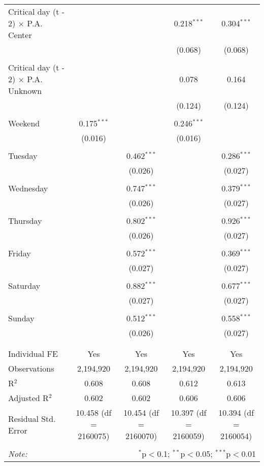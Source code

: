 \documentclass[
]{article}
\begin{document}
\begin{table}[!htbp]
{\begin{tabular}{@{\extracolsep{5pt}}lcccc}
 Critical day (t - 2) $\times$ P.A. Center &  &  & 0.218$^{***}$ & 0.304$^{***}$ \\ 
  &  &  & (0.068) & (0.068) \\ 
  & & & & \\ 
 Critical day (t - 2) $\times$ P.A. Unknown &  &  & 0.078 & 0.164 \\ 
  &  &  & (0.124) & (0.124) \\ 
  & & & & \\ 
 Weekend & 0.175$^{***}$ &  & 0.246$^{***}$ &  \\ 
  & (0.016) &  & (0.016) &  \\ 
  & & & & \\ 
 Tuesday &  & 0.462$^{***}$ &  & 0.286$^{***}$ \\ 
  &  & (0.026) &  & (0.027) \\ 
  & & & & \\ 
 Wednesday &  & 0.747$^{***}$ &  & 0.379$^{***}$ \\ 
  &  & (0.026) &  & (0.027) \\ 
  & & & & \\ 
 Thursday &  & 0.802$^{***}$ &  & 0.926$^{***}$ \\ 
  &  & (0.026) &  & (0.027) \\ 
  & & & & \\ 
 Friday &  & 0.572$^{***}$ &  & 0.369$^{***}$ \\ 
  &  & (0.027) &  & (0.027) \\ 
  & & & & \\ 
 Saturday &  & 0.882$^{***}$ &  & 0.677$^{***}$ \\ 
  &  & (0.027) &  & (0.027) \\ 
  & & & & \\ 
 Sunday &  & 0.512$^{***}$ &  & 0.558$^{***}$ \\ 
  &  & (0.026) &  & (0.027) \\ 
  & & & & \\ 
\hline \\[-1.8ex] 
Individual FE & Yes & Yes & Yes & Yes \\ 
Observations & 2,194,920 & 2,194,920 & 2,194,920 & 2,194,920 \\ 
R$^{2}$ & 0.608 & 0.608 & 0.612 & 0.613 \\ 
Adjusted R$^{2}$ & 0.602 & 0.602 & 0.606 & 0.606 \\ 
Residual Std. Error & 10.458 (df = 2160075) & 10.454 (df = 2160070) & 10.397 (df = 2160059) & 10.394 (df = 2160054) \\ 
\hline 
\hline \\[-1.8ex] 
\textit{Note:}  & \multicolumn{4}{r}{$^{*}$p$<$0.1; $^{**}$p$<$0.05; $^{***}$p$<$0.01} \\ 
\end{tabular}
} 
\end{table} 
\newpage
\end{document}
